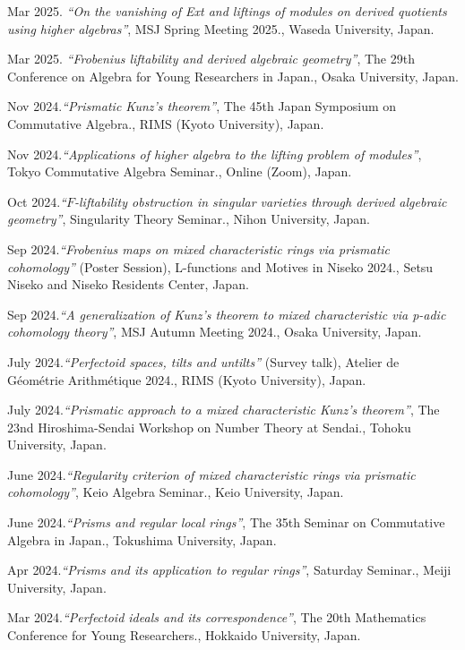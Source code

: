 \documentclass[10pt,a4paper,sans]{moderncv}
\begin{document}
\begin{etaremune}
  \item Mar 2025. \emph{``On the vanishing of Ext and liftings of modules on derived quotients using higher algebras''}, \textsf{MSJ Spring Meeting 2025.}, Waseda University, Japan.
  \item Mar 2025. \emph{``Frobenius liftability and derived algebraic geometry''}, \textsf{The 29th Conference on Algebra for Young Researchers in Japan.}, Osaka University, Japan.
  \item Nov 2024.\emph{``Prismatic Kunz's theorem''}, \textsf{The 45th Japan Symposium on Commutative Algebra.}, RIMS (Kyoto University), Japan.
  \item Nov 2024.\emph{``Applications of higher algebra to the lifting problem of modules''}, \textsf{Tokyo Commutative Algebra Seminar.}, Online (Zoom), Japan.
  \item Oct 2024.\emph{``\(F\)-liftability obstruction in singular varieties through derived algebraic geometry''}, \textsf{Singularity Theory Seminar.}, Nihon University, Japan.
  \item Sep 2024.\emph{``Frobenius maps on mixed characteristic rings via prismatic cohomology''} (Poster Session), \textsf{L-functions and Motives in Niseko 2024.}, Setsu Niseko and Niseko Residents Center, Japan.
  \item Sep 2024.\emph{``A generalization of Kunz's theorem to mixed characteristic via p-adic cohomology theory''}, \textsf{MSJ Autumn Meeting 2024.}, Osaka University, Japan.
  \item July 2024.\emph{``Perfectoid spaces, tilts and untilts''} (Survey talk), \textsf{Atelier de Géométrie Arithmétique 2024.}, RIMS (Kyoto University), Japan.
  \item July 2024.\emph{``Prismatic approach to a mixed characteristic Kunz's theorem''}, \textsf{The 23nd Hiroshima-Sendai Workshop on Number Theory at Sendai.}, Tohoku University, Japan.
  \item June 2024.\emph{``Regularity criterion of mixed characteristic rings via prismatic cohomology''}, \textsf{Keio Algebra Seminar.}, Keio University, Japan.
  \item June 2024.\emph{``Prisms and regular local rings''}, \textsf{The 35th Seminar on Commutative Algebra in Japan.}, Tokushima University, Japan.
  \item Apr 2024.\emph{``Prisms and its application to regular rings''}, \textsf{Saturday Seminar.}, Meiji University, Japan.
  \item Mar 2024.\emph{``Perfectoid ideals and its correspondence''}, \textsf{The 20th Mathematics Conference for Young Researchers.}, Hokkaido University, Japan.

\end{etaremune}
\end{document}
